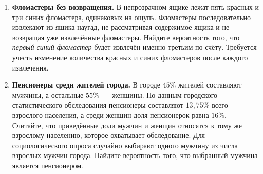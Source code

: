 \documentclass[a4paper,12pt]{article}
\begin{document}
\begin{enumerate}[label=\textbf{\arabic*.},wide=0pt]
\subsection*{Сложный уровень}
\item \textbf{Фломастеры без возвращения.} В непрозрачном ящике лежат пять красных и три синих фломастера, одинаковых на ощупь. Фломастеры последовательно извлекают из ящика наугад, не рассматривая содержимое ящика и не возвращая уже извлечённые фломастеры. Найдите вероятность того, что \emph{первый синий фломастер} будет извлечён именно третьим по счёту. Требуется учесть изменение количества красных и синих фломастеров после каждого извлечения.

\item \textbf{Пенсионеры среди жителей города.} В городе $45\%$ жителей составляют мужчины, а остальные $55\%$~--- женщины. По данным городского статистического обследования пенсионеры составляют $13{,}75\%$ всего взрослого населения, а среди женщин доля пенсионерок равна $16\%$. Считайте, что приведённые доли мужчин и женщин относятся к тому же взрослому населению, которое охватывает обследование. Для социологического опроса случайно выбирают одного мужчину из числа взрослых мужчин города. Найдите вероятность того, что выбранный мужчина является пенсионером.
\end{enumerate}

\clearpage
\end{document}
